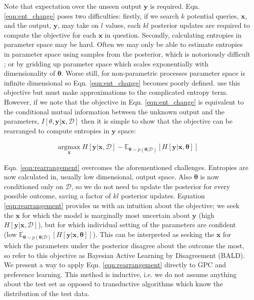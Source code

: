 \documentclass{article}
\newcommand{\x}{\bm{x}}
\newcommand{\y}{\bm{y}}
\newcommand{\data}{\mathcal{D}}
\newcommand{\param}{\bm{\theta}}
\newcommand{\argmax}{ \operatorname*{arg \max}}
\newcommand{\E}{\mathbb{E}}
\begin{document}
Note that expectation over the unseen output $\y$ is required. Eqn. \eqref{eqn:ent_change} poses two difficulties: firstly,  if we search $k$ potential queries,  $\x$, and the output, $\y$, may take on $l$ values, each $kl$ posterior updates are required to compute the objective for each $\x$ in question. Secondly, calculating entropies in parameter space may be hard. Often we may only be able to estimate entropies in parameter space using samples from the posterior, which is notoriously difficult \cite{panzeri2007}; or by gridding up parameter space which scales exponentially with dimensionality of $\param$. Worse still, for non-parametric processes parameter space is infinite dimensional so Eqn. \eqref{eqn:ent_change} becomes poorly defined. \cite{mackay1992, krishnapuram2004, lawrence2004} use this objective but must make approximations to the complicated entropy term. However, if we note that the objective in Eqn. \eqref{eqn:ent_change} is equivalent to the conditional mutual information between the unknown output and the parameters, $I[\theta,\y\vert\x,\data]$ then it is simple to show that the objective can be rearranged to compute entropies in $\y$ space:

\begin{align}
\argmax_{\x} H[\y \vert \x, \data] - \E_{\param\sim p(\param|\data)} \left[ H[\y \vert \x,\param] \right] \label{eqn:rearrangement} 
\end{align}

Eqn. \eqref{eqn:rearrangement} overcomes the aforementioned challenges. Entropies are now calculated in, usually low dimensional, output space. Also $\param$ is now conditioned only on $\data$, so we do not need to update the posterior for every possible outcome, saving a factor of $kl$ posterior updates. Equation \eqref{eqn:rearrangement} provides us with an intuition about the objective; we seek the $\x$ for which the model is marginally most uncertain about $\y$ (high $H[\y \vert \x, \data]$), but for which individual setting of the parameters are confident (low $\E_{\param\sim p(\param|\data)} \left[ H[\y \vert \x,\param] \right]$). This can be interpreted as seeking the $\x$ for which the parameters under the posterior disagree about the outcome the most, so refer to this objective as Bayesian Active Learning by Disagreement (BALD). We present a way to apply Eqn. \eqref{eqn:rearrangement} directly to GPC and preference learning. This method is inductive, i.e. we do not assume anything about the test set as opposed to transductive algorithms which know the distribution of the test data.
\end{document}
